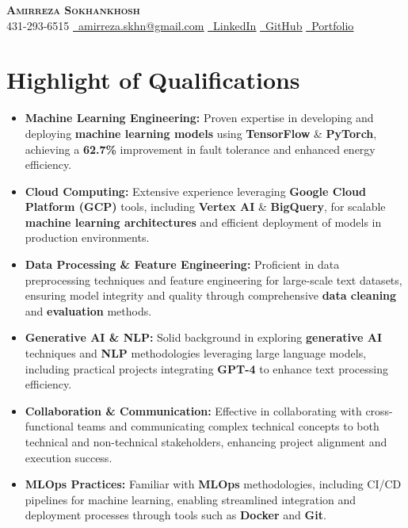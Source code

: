 \documentclass[letterpaper,11pt]{article}
\newcommand{\resumeItem}[1]{
  \item\small{
    #1 \vspace{0pt}
  }
}
\newcommand{\resumeItemListStart}{\begin{itemize}}
\newcommand{\resumeItemListEnd}{\end{itemize}\vspace{-5pt}}
\begin{document}


\begin{center}
    \textbf{\Huge \scshape Amirreza Sokhankhosh} \\ \vspace{1pt}
    \faPhone \small 431-293-6515 \quad
    \href{mailto:amirreza.skhn@gmail.com}{\faEnvelope \ \underline{amirreza.skhn@gmail.com}} \quad
    \href{https://www.linkedin.com/in/amirrezakh/}{\faLinkedin \ \underline{LinkedIn}} \quad
    \href{https://github.com/amirrezaskh}{\faGithub \ \underline{GitHub}} \quad
    \href{https://amirrezaskh.com}{\faBriefcase \ \underline{Portfolio}}
\end{center}

\section{Highlight of Qualifications}
\resumeItemListStart
\resumeItem{\textbf{Machine Learning Engineering:} Proven expertise in developing and deploying \textbf{machine learning models} using \textbf{TensorFlow} \& \textbf{PyTorch}, achieving a \textbf{62.7\%} improvement in fault tolerance and enhanced energy efficiency.}
\resumeItem{\textbf{Cloud Computing:} Extensive experience leveraging \textbf{Google Cloud Platform (GCP)} tools, including \textbf{Vertex AI} \& \textbf{BigQuery}, for scalable \textbf{machine learning architectures} and efficient deployment of models in production environments.}
\resumeItem{\textbf{Data Processing \& Feature Engineering:} Proficient in data preprocessing techniques and feature engineering for large-scale text datasets, ensuring model integrity and quality through comprehensive \textbf{data cleaning} and \textbf{evaluation} methods.}
\resumeItem{\textbf{Generative AI \& NLP:} Solid background in exploring \textbf{generative AI} techniques and \textbf{NLP} methodologies leveraging large language models, including practical projects integrating \textbf{GPT-4} to enhance text processing efficiency.}
\resumeItem{\textbf{Collaboration \& Communication:} Effective in collaborating with cross-functional teams and communicating complex technical concepts to both technical and non-technical stakeholders, enhancing project alignment and execution success.}
\resumeItem{\textbf{MLOps Practices:} Familiar with \textbf{MLOps} methodologies, including CI/CD pipelines for machine learning, enabling streamlined integration and deployment processes through tools such as \textbf{Docker} and \textbf{Git}.}
\resumeItemListEnd
\end{document}
